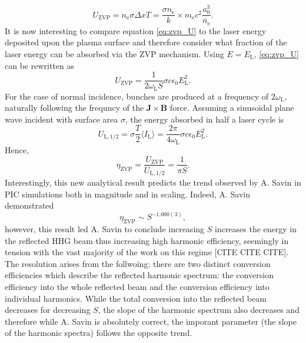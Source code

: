 \begin{equation}\label{eq:zvp_U}
	U_\mathrm{ZVP} = n_\mathrm{e}\sigma\Delta x T = \frac{\sigma n_\mathrm{e}}{k}\times m_\mathrm{e}c^2 \frac{a^3_0}{\bar{n}_\mathrm{e}}.
\end{equation}
It is now interesting to compare equation \ref{eq:zvp_U} to the laser energy deposited upon the plasma surface and therefore consider what fraction of the laser energy can be absorbed via the \ac{ZVP} mechanism. Using $E = E_\mathrm{L}$, \ref{eq:zvp_U} can be rewritten as
\begin{equation}
	U_\mathrm{ZVP} = \frac{1}{2\omega_\mathrm{L} S}\sigma c \epsilon_0 E^2_\mathrm{L}.
\end{equation}
For the case of normal incidence, bunches are produced at a frequency of $2\omega_\mathrm{L}$, naturally following the frequncy of the $\mathbf{J}\times \mathbf{B}$ force. Assuming a sinusoidal plane wave incident with surface area $\sigma$, the energy absorbed in half a laser cycle is
\begin{equation}
	 U_\mathrm{L,1/2} = \sigma \frac{T}{2}\langle I_\mathrm{L}\rangle = \frac{2\pi}{4\omega_\mathrm{L}}\sigma c\epsilon_0E^2_\mathrm{L}.
\end{equation}
Hence,
\begin{equation}
	\eta_\mathrm{ZVP} = \frac{U_\mathrm{ZVP}}{U_\mathrm{L,1/2}} = \frac{1}{\pi S}.
\end{equation}
Interestingly, this new analytical result predicts the trend observed by A. Savin \cite{savin_2019_ModellingLaserPlasmaInteractions} in \ac{PIC} simulations both in magnitude and in scaling. Indeed, A. Savin demonstrated 
\begin{equation}
	\eta_\mathrm{ZVP} \sim S^{-1.000(3)},
\end{equation}
however, this result led A. Savin to conclude increasing $S$ increases the energy in the reflected \ac{HHG} beam thus increasing high harmonic efficiency, seemingly in tension with the vast majority of the work on this regime [CITE CITE CITE]. The resolution arises from the follwoing: there are two distinct conversion efficiencies which describe the reflected harmonic spectrum: the conversion efficiency into the whole reflected beam and the conversion efficiency into individual harmonics. While the total conversion into the reflected beam decreases for decreasing $S$, the slope of the harmonic spectrum also decreases and therefore while A. Savin is absolutely correct, the imporant parameter (the slope of the harmonic spectra) follows the opposite trend.

